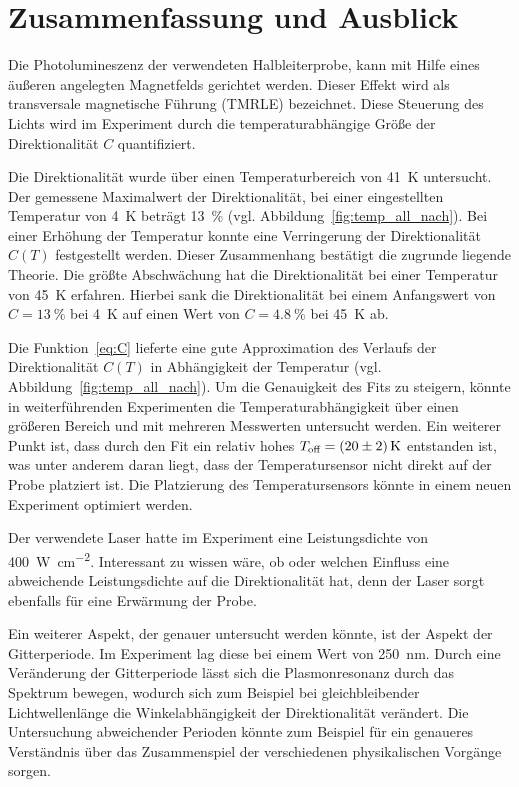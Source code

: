 \chapter{Zusammenfassung und Ausblick}
Die Photolumineszenz der verwendeten Halbleiterprobe, kann mit Hilfe 
eines äußeren angelegten Magnetfelds gerichtet werden.
Dieser Effekt wird als transversale magnetische Führung (TMRLE)
bezeichnet.
Diese Steuerung des Lichts wird im Experiment durch die temperaturabhängige Größe der Direktionalität $C$
quantifiziert. 

Die Direktionalität wurde über einen Temperaturbereich von \SI{41}{\kelvin}
untersucht.
Der gemessene Maximalwert der Direktionalität, bei einer eingestellten Temperatur
von \SI{4}{\kelvin} beträgt \SI{13}{\percent} (vgl. Abbildung~\ref{fig:temp_all_nach}). 
Bei einer Erhöhung der Temperatur konnte eine Verringerung der Direktionalität $C(T)$ festgestellt werden.
Dieser Zusammenhang bestätigt die zugrunde liegende Theorie.
Die größte Abschwächung hat die Direktionalität bei einer Temperatur von \SI{45}{\kelvin}
erfahren.
Hierbei sank die Direktionalität bei einem Anfangswert von $C=\SI{13}{\percent}$ bei \SI{4}{\kelvin} 
auf einen Wert von $C=\SI{4,8}{\percent}$ bei \SI{45}{\kelvin} ab.

Die Funktion~\ref{eq:C} lieferte eine gute Approximation des Verlaufs der Direktionalität $C(T)$
in Abhängigkeit der Temperatur (vgl. Abbildung~\ref{fig:temp_all_nach}).
Um die Genauigkeit des Fits zu steigern, könnte in weiterführenden Experimenten 
die Temperaturabhängigkeit über einen größeren Bereich und mit mehreren Messwerten untersucht werden.
Ein weiterer Punkt ist, dass durch den Fit ein relativ hohes $T_\text{off} =  \SI{20\pm 2}{\kelvin}$
entstanden ist, was unter anderem daran liegt, dass der Temperatursensor nicht direkt auf der Probe platziert ist.
Die Platzierung des Temperatursensors könnte in einem neuen Experiment optimiert werden.

Der verwendete Laser hatte im Experiment eine Leistungsdichte von \SI{400}{\watt\centi\meter^{-2}}.
Interessant zu wissen wäre, ob oder welchen Einfluss eine abweichende Leistungsdichte 
auf die Direktionalität hat, denn der Laser sorgt ebenfalls für eine Erwärmung der Probe.

Ein weiterer Aspekt, der genauer untersucht werden könnte, ist der Aspekt der Gitterperiode.
Im Experiment lag diese bei einem Wert von \SI{250}{\nano\meter}.
Durch eine Veränderung der Gitterperiode lässt sich die Plasmonresonanz durch das Spektrum bewegen, 
wodurch sich zum Beispiel bei gleichbleibender Lichtwellenlänge die Winkelabhängigkeit der Direktionalität verändert. 
Die Untersuchung abweichender Perioden könnte zum Beispiel für ein genaueres Verständnis über das 
Zusammenspiel der verschiedenen physikalischen Vorgänge sorgen.
